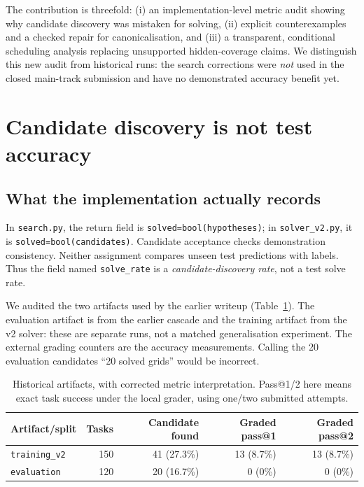 \documentclass[10pt,a4paper]{article}
\begin{document}
The contribution is threefold: (i) an implementation-level metric audit showing why candidate discovery was mistaken for solving, (ii) explicit counterexamples and a checked repair for canonicalisation, and (iii) a transparent, conditional scheduling analysis replacing unsupported hidden-coverage claims. We distinguish this new audit from historical runs: the search corrections were \emph{not} used in the closed main-track submission and have no demonstrated accuracy benefit yet.

\section{Candidate discovery is not test accuracy}
\subsection{What the implementation actually records}
In \texttt{search.py}, the return field is \texttt{solved=bool(hypotheses)}; in \texttt{solver\_v2.py}, it is \texttt{solved=bool(candidates)}. Candidate acceptance checks demonstration consistency. Neither assignment compares unseen test predictions with labels. Thus the field named \texttt{solve\_rate} is a \emph{candidate-discovery rate}, not a test solve rate.

We audited the two artifacts used by the earlier writeup (Table~\ref{tab:metrics}). The evaluation artifact is from the earlier cascade and the training artifact from the v2 solver: these are separate runs, not a matched generalisation experiment. The external grading counters are the accuracy measurements. Calling the 20 evaluation candidates ``20 solved grids'' would be incorrect.

\begin{table}[ht]
\centering
\caption{Historical artifacts, with corrected metric interpretation. Pass@1/2 here means exact task success under the local grader, using one/two submitted attempts.}
\label{tab:metrics}
\begin{tabular}{lrrrr}
\toprule
Artifact/split & Tasks & Candidate found & Graded pass@1 & Graded pass@2\\
\midrule
\texttt{training\_v2} & 150 & 41 (27.3\%) & 13 (8.7\%) & 13 (8.7\%)\\
\texttt{evaluation} & 120 & 20 (16.7\%) & 0 (0\%) & 0 (0\%)\\
\bottomrule
\end{tabular}
\end{table}
\end{document}
